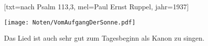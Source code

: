 [txt={nach Psalm 113,3}, mel={Paul Ernst Ruppel}, jahr={1937}]

\beginverse
\endverse
\centering\texttt{[image: Noten/VomAufgangDerSonne.pdf]}

\endsong

\beginscripture{}
Das Lied ist auch sehr gut zum Tagesbeginn als Kanon zu singen.
\endscripture

